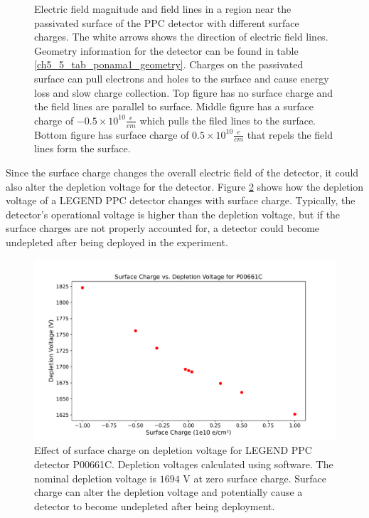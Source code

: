 \begin{figure}
\caption{Electric field magnitude and field lines in a region near the passivated surface of the {\ponama} PPC detector with different surface charges. The white arrows shows the direction of electric field lines. Geometry information for the detector can be found in table \ref{ch5_5_tab_ponama1_geometry}. Charges on the passivated surface can pull electrons and holes to the surface and cause energy loss and slow charge collection. Top figure has no surface charge and the field lines are parallel to surface. Middle figure has a surface charge of $-0.5 \times 10^{10} \frac{e}{cm}$ which pulls the filed lines to the surface. Bottom figure has surface charge of $0.5 \times 10^{10} \frac{e}{cm}$ that repels the field lines form the surface.}
\label{ch3_fig_surface_field_sc0}
\end{figure}

Since the surface charge changes the overall electric field of the detector, it could also alter the depletion voltage for the detector. Figure \ref{ch3_fig_deplection_sc} shows how the depletion voltage of a LEGEND PPC detector changes with surface charge. Typically, the detector's operational voltage is higher than the depletion voltage, but if the surface charges are not properly accounted for, a detector could become undepleted after being deployed in the experiment.

\begin{figure}[!htb]
\centering
\includegraphics[trim={1cm 0.4cm 1cm 1.75cm},clip,width=0.99\linewidth]{ch3/figs/deplep_sc.pdf}
 \caption{Effect of surface charge on depletion voltage for LEGEND PPC detector P00661C. Depletion voltages calculated using {\siggen} software. The nominal depletion voltage is $1694$ V at zero surface charge. Surface charge can alter the depletion voltage and potentially cause a detector to become undepleted after being deployment.
}
\label{ch3_fig_deplection_sc}
  \end{figure}

